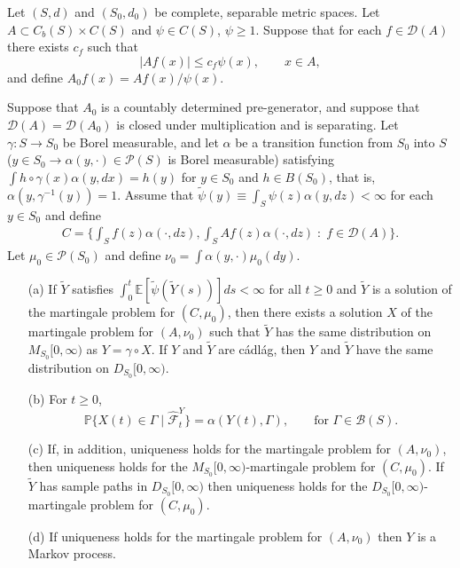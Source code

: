 \documentclass[EJP]{ejpecp} %
\renewcommand{\hat}{\widehat}
\renewcommand{\tilde}{\widetilde}
\newcommand{\IP}{\mathbb P}
\newcommand{\IE}{\mathbb E}
\begin{document}
\begin{theorem} \label{thm:mmt}
    Let $(S,d)$ and $(S_0,d_0)$ be complete, separable metric spaces.
    Let $A \subset C_b(S) \times C(S)$ and $\psi \in C(S)$, $\psi \ge 1$.
    Suppose that for each $f \in \mathcal{D}(A)$ there exists $c_f$
    such that
    $$ |Af(x)| \le c_f \psi(x), \qquad x \in A, $$
    and define $A_0 f(x) = Af(x) / \psi(x)$.

    Suppose that $A_0$ is a countably determined pre-generator,
    and suppose that $\mathcal{D}(A) = \mathcal{D}(A_0)$
    is closed under multiplication and is separating.
    Let $\gamma : S \to S_0$ be Borel measurable,
    and let $\alpha$ be a transition function from $S_0$ into $S$
    ($y \in S_0 \to \alpha(y,\cdot)\in\mathcal{P}(S)$ is Borel measurable)
    satisfying $\int h\circ\gamma(x)\alpha(y,dx) = h(y)$ for $y \in S_0$ and $h \in B(S_0)$,
    that is, $\alpha(y,\gamma^{-1}(y)) = 1$.
    Assume that $\tilde \psi(y) \equiv \int_S \psi(z) \alpha(y,dz) < \infty$ for each $y \in S_0$
    and define
    \begin{align} \label{eqn:C_defn}
        C = \{
        \int_S f(z) \alpha(\cdot,dz),
        \int_S Af(z) \alpha(\cdot,dz)
        \; : \; f \in \mathcal{D}(A)
    \} . \end{align}
    Let $\mu_0 \in \mathcal{P}(S_0)$ and define $\nu_0 = \int \alpha(y,\cdot) \mu_0(dy)$.
    \begin{itemize}
        \item[(a)]
            If $\tilde Y$ satisfies $\int_0^t \IE[\tilde \psi(\tilde Y(s))]ds < \infty$
            for all $t \ge 0$ and $\tilde Y$ is a solution of the martingale problem for $(C,\mu_0)$,
            then there exists a solution $X$ of the martingale problem for $(A,\nu_0)$
            such that $\tilde Y$ has the same distribution on $M_{S_0}[0,\infty)$
            as $Y = \gamma \circ X$.
            If $Y$ and $\tilde Y$ are c\'adl\'ag, then $Y$ and $\tilde Y$ have the same distribution
            on $D_{S_0}[0,\infty)$.
        \item[(b)]
            For $t \ge 0$,
            $$ \IP\{ X(t) \in \Gamma \;|\; \hat{\mathcal{F}}^Y_t \}
            = \alpha(Y(t),\Gamma), \qquad \text{for } \Gamma \in \mathcal{B}(S).
            $$
        \item[(c)]
            If, in addition, uniqueness holds for the martingale problem for $(A,\nu_0)$,
            then uniqueness holds for the $M_{S_0}[0,\infty)$-martingale problem for $(C,\mu_0)$.
            If $\tilde Y$ has sample paths in $D_{S_0}[0,\infty)$ then uniqueness holds for the
            $D_{S_0}[0,\infty)$-martingale problem for $(C,\mu_0)$.
        \item[(d)]
            If uniqueness holds for the martingale problem for $(A,\nu_0)$
            then $Y$ is a Markov process.
    \end{itemize}
\end{theorem}
\end{document}
